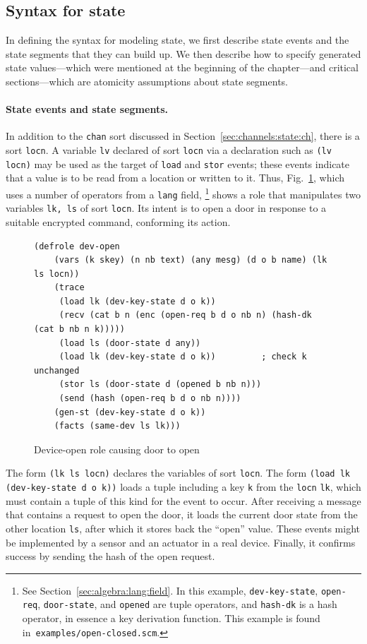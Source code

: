 \subsection{Syntax for state}
\label{sec:channels:state:syntax}

In defining the syntax for modeling state, we first describe state
events and the state segments that they can build up.  We then
describe how to specify generated state values---which were mentioned
at the beginning of the chapter---and critical sections---which are
atomicity assumptions about state segments.

\paragraph{State events and state segments.}  In addition to the
\verb|chan| sort discussed in Section~\ref{sec:channels:state:ch},
there is a sort \verb|locn|.  A variable \verb|lv| declared of sort
\verb|locn| via a declaration such as \verb|(lv locn)| may be used as
the target of \verb|load| and \verb|stor| events; these events
indicate that a value is to be read from a location or written to it.
Thus, Fig.~\ref{fig:dev:open}, which uses a number of operators from a
\texttt{lang} field,%
\footnote{See Section~\ref{sec:algebra:lang:field}.  In this example,
  \texttt{dev-key-state}, \texttt{open-req}, \texttt{door-state}, and
  \texttt{opened} are tuple operators, and \texttt{hash-dk} is a hash
  operator, in essence a key derivation function.  This example is
  found in~\texttt{examples/open-closed.scm}.}
%
shows a role that manipulates two variables \texttt{lk, ls} of sort
\verb|locn|.  Its intent is to open a door in response to a suitable
encrypted command, conforming its action.
%
%
\begin{figure}\small
\begin{verbatim}(defrole dev-open
    (vars (k skey) (n nb text) (any mesg) (d o b name) (lk ls locn))
    (trace
     (load lk (dev-key-state d o k))
     (recv (cat b n (enc (open-req b d o nb n) (hash-dk (cat b nb n k)))))
     (load ls (door-state d any))
     (load lk (dev-key-state d o k))         ; check k unchanged
     (stor ls (door-state d (opened b nb n)))
     (send (hash (open-req b d o nb n))))
    (gen-st (dev-key-state d o k))
    (facts (same-dev ls lk)))\end{verbatim}
  \caption{Device-open role causing door to open}
  \label{fig:dev:open}
\end{figure}
%
The form \texttt{(lk ls locn)} declares the variables of sort
\verb|locn|.  The form \texttt{(load lk (dev-key-state d o k))} loads
a tuple including a key \verb|k| from the \verb|locn| \verb|lk|, which
must contain a tuple of this kind for the event to occur.  After
receiving a message that contains a request to open the door, it loads
the current door state from the other location \verb|ls|, after which
it stores back the ``open'' value.  These events might be implemented
by a sensor and an actuator in a real device.  Finally, it confirms
success by sending the hash of the open request.

